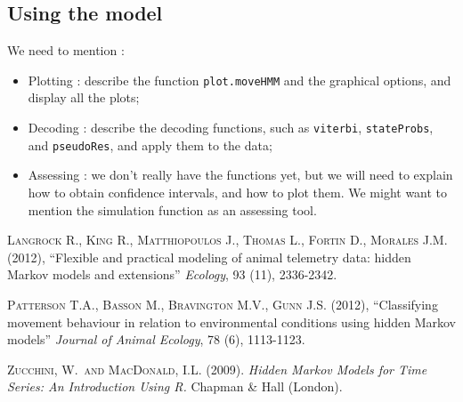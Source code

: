 \documentclass[]{article}
\begin{document}
\subsection{Using the model}
We need to mention :
\begin{itemize}
	\item Plotting : describe the function \texttt{plot.moveHMM} and the graphical options, and display all the plots;
	\item Decoding : describe the decoding functions, such as \texttt{viterbi}, \texttt{stateProbs}, and \texttt{pseudoRes}, and apply them to the data;
	\item Assessing : we don't really have the functions yet, but we will need to explain how to obtain confidence intervals, and how to plot them. We might want to mention the simulation function as an assessing tool.
\end{itemize}


\begin{thebibliography}{}

\textsc{Langrock R., King R., Matthiopoulos J., Thomas L., Fortin D., Morales J.M.} (2012),
``Flexible and practical modeling of animal telemetry data: hidden Markov models and extensions''
\textit{Ecology}, 93 (11), 2336-2342.

\textsc{Patterson T.A., Basson M., Bravington M.V., Gunn J.S.} (2012),
``Classifying movement behaviour in relation to environmental conditions using hidden Markov models''
\textit{Journal of Animal Ecology}, 78 (6), 1113-1123.

\textsc{Zucchini, W.\ and MacDonald, I.L.} (2009).
{\em Hidden Markov Models for Time Series: An Introduction Using R.}
Chapman \& Hall (London).

\end{thebibliography}
\end{document}
